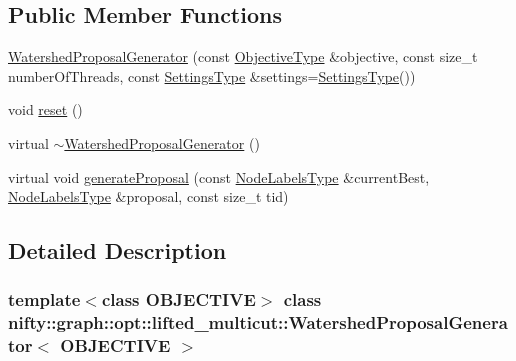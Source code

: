 \subsection*{Public Member Functions}
\begin{DoxyCompactItemize}
\item 
\hyperlink{classnifty_1_1graph_1_1opt_1_1lifted__multicut_1_1WatershedProposalGenerator_afc333a56e0951755caf98bbb96833bf7}{Watershed\+Proposal\+Generator} (const \hyperlink{classnifty_1_1graph_1_1opt_1_1lifted__multicut_1_1WatershedProposalGenerator_a78cd96503ad62ae011fe42ff87692984}{Objective\+Type} \&objective, const size\+\_\+t number\+Of\+Threads, const \hyperlink{structnifty_1_1graph_1_1opt_1_1lifted__multicut_1_1WatershedProposalGenerator_1_1SettingsType}{Settings\+Type} \&settings=\hyperlink{structnifty_1_1graph_1_1opt_1_1lifted__multicut_1_1WatershedProposalGenerator_1_1SettingsType}{Settings\+Type}())
\item 
void \hyperlink{classnifty_1_1graph_1_1opt_1_1lifted__multicut_1_1WatershedProposalGenerator_aeb719bc98cef132258b1f366d0f5e5e2}{reset} ()
\item 
virtual \hyperlink{classnifty_1_1graph_1_1opt_1_1lifted__multicut_1_1WatershedProposalGenerator_ad83021bba307bd8e0bf8635c47b1909f}{$\sim$\+Watershed\+Proposal\+Generator} ()
\item 
virtual void \hyperlink{classnifty_1_1graph_1_1opt_1_1lifted__multicut_1_1WatershedProposalGenerator_ab831f2fa9c17d253d3dfd2005130b49c}{generate\+Proposal} (const \hyperlink{classnifty_1_1graph_1_1opt_1_1lifted__multicut_1_1ProposalGeneratorBase_ab102e54a80aba7ed8884d61ae0803954}{Node\+Labels\+Type} \&current\+Best, \hyperlink{classnifty_1_1graph_1_1opt_1_1lifted__multicut_1_1ProposalGeneratorBase_ab102e54a80aba7ed8884d61ae0803954}{Node\+Labels\+Type} \&proposal, const size\+\_\+t tid)
\end{DoxyCompactItemize}


\subsection{Detailed Description}
\subsubsection*{template$<$class O\+B\+J\+E\+C\+T\+I\+VE$>$\newline
class nifty\+::graph\+::opt\+::lifted\+\_\+multicut\+::\+Watershed\+Proposal\+Generator$<$ O\+B\+J\+E\+C\+T\+I\+V\+E $>$}

